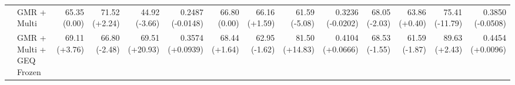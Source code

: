 \documentclass{article}
\begin{document}
{\begin{tabular}{llrrrrrrrrrrrr}
 & GMR + Multi & \shortstack{65.35 \\ {\scriptsize\textcolor{Zero}{(0.00)}}} & \shortstack{71.52 \\ {\scriptsize\textcolor{Gain}{(+2.24)}}} & \shortstack{44.92 \\ {\scriptsize\textcolor{Loss}{(-3.66)}}} & \shortstack{0.2487 \\ {\scriptsize\textcolor{Loss}{(-0.0148)}}} & \shortstack{66.80 \\ {\scriptsize\textcolor{Zero}{(0.00)}}} & \shortstack{66.16 \\ {\scriptsize\textcolor{Gain}{(+1.59)}}} & \shortstack{61.59 \\ {\scriptsize\textcolor{Loss}{(-5.08)}}} & \shortstack{0.3236 \\ {\scriptsize\textcolor{Loss}{(-0.0202)}}} & \shortstack{68.05 \\ {\scriptsize\textcolor{Loss}{(-2.03)}}} & \shortstack{63.86 \\ {\scriptsize\textcolor{Gain}{(+0.40)}}} & \shortstack{75.41 \\ {\scriptsize\textcolor{Loss}{(-11.79)}}} & \shortstack{0.3850 \\ {\scriptsize\textcolor{Loss}{(-0.0508)}}} \\
 & GMR + Multi + GEQ Frozen & \shortstack{69.11 \\ {\scriptsize\textcolor{Gain}{(+3.76)}}} & \shortstack{66.80 \\ {\scriptsize\textcolor{Loss}{(-2.48)}}} & \shortstack{69.51 \\ {\scriptsize\textcolor{Gain}{(+20.93)}}} & \shortstack{0.3574 \\ {\scriptsize\textcolor{Gain}{(+0.0939)}}} & \shortstack{68.44 \\ {\scriptsize\textcolor{Gain}{(+1.64)}}} & \shortstack{62.95 \\ {\scriptsize\textcolor{Loss}{(-1.62)}}} & \shortstack{81.50 \\ {\scriptsize\textcolor{Gain}{(+14.83)}}} & \shortstack{0.4104 \\ {\scriptsize\textcolor{Gain}{(+0.0666)}}} & \shortstack{68.53 \\ {\scriptsize\textcolor{Loss}{(-1.55)}}} & \shortstack{61.59 \\ {\scriptsize\textcolor{Loss}{(-1.87)}}} & \shortstack{89.63 \\ {\scriptsize\textcolor{Gain}{(+2.43)}}} & \shortstack{0.4454 \\ {\scriptsize\textcolor{Gain}{(+0.0096)}}} \\

\end{tabular}}
\end{document}
